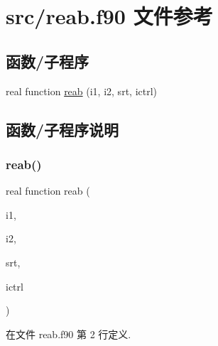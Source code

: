 \hypertarget{reab_8f90}{}\section{src/reab.f90 文件参考}
\label{reab_8f90}
\subsection*{函数/子程序}
\begin{DoxyCompactItemize}
\item 
real function \mbox{\hyperlink{reab_8f90_a6d6781355435a7889727d82e7a8e96dc}{reab}} (i1, i2, srt, ictrl)
\end{DoxyCompactItemize}


\subsection{函数/子程序说明}
\mbox{\label{reab_8f90_a6d6781355435a7889727d82e7a8e96dc}} 
\subsubsection{\texorpdfstring{reab()}{reab()}}
{\footnotesize\ttfamily real function reab (\begin{DoxyParamCaption}\item[{}]{i1,  }\item[{}]{i2,  }\item[{}]{srt,  }\item[{}]{ictrl }\end{DoxyParamCaption})}



在文件 reab.\+f90 第 2 行定义.


